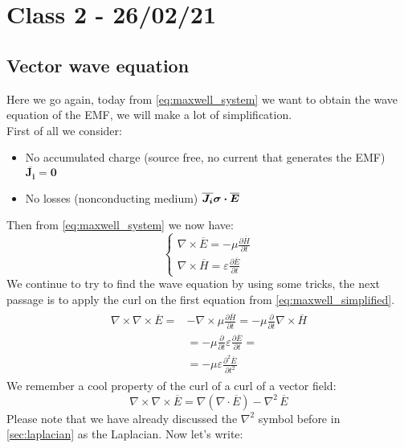 \section{Class 2 - 26/02/21}
\subsection*{Vector wave equation}
Here we go again, today from \cref{eq:maxwell_system} we want to obtain the wave equation of the EMF, we will make a lot of simplification.\\
First of all we consider:
\begin{itemize}
    \item No accumulated charge (source free, no current that generates the EMF) $\boldsymbol{\overline{J_i}=0}$
    \item No losses (nonconducting medium) $\boldsymbol{\overline{J_i}$ $\sigma \cdot\overline{E}}$
\end{itemize}
Then from \cref{eq:maxwell_system} we now have:
\begin{equation}\label{eq:maxwell_simplified}
    \begin{cases}
    \nabla\times\overline{E}=-\mu\frac{\partial \overline{H}}{\partial t}\\[5pt]
    \nabla\times\overline{H}=\varepsilon\frac{\partial \overline{E}}{\partial t}
    \end{cases}
\end{equation}
We continue to try to find the wave equation by using some tricks, the next passage is to apply the curl on the first equation from \cref{eq:maxwell_simplified}.
\begin{align}
    \begin{split}
        \nabla\times\nabla\times\overline{E}=&-\nabla\times\mu \frac{\partial \overline{H}}{\partial t}=-\mu \frac{\partial}{\partial t} \nabla\times \overline{H}\\[5pt]
        &=-\mu \frac{\partial}{\partial t}\varepsilon\frac{\partial \overline{E}}{\partial t}=\\[5pt]
        &=-\mu \varepsilon \frac{\partial^2\overline{E}}{\partial t^2}
    \end{split}
\end{align}
We remember a cool property of the curl of a curl of a vector field:
\begin{equation}
    \nabla\times\nabla\times\overline{E}=\nabla(\nabla\cdot \overline{E})-\nabla^2\,\overline{E}
\end{equation}
Please note that we have already discussed the $\nabla^2$ symbol before in \cref{sec:laplacian} as the Laplacian. Now let's write:
